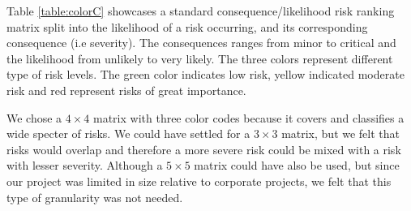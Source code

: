 \begin{table}[h]
\caption{Consequence and likelihood color coding risk matrix}
\label{table:colorC}
\end{table}

Table \ref{table:colorC} showcases a standard consequence/likelihood risk ranking matrix split into the likelihood of a risk occurring, and its corresponding consequence (i.e severity). The consequences ranges from minor to critical and the likelihood from unlikely to very likely. The three colors represent different type of risk levels. The green color indicates low risk, yellow indicated moderate risk and red represent risks of great importance. 

We chose a $4\times4$ matrix with three color codes because it covers and classifies a wide specter of risks. We could have settled for a $3\times3$ matrix, but we felt that risks would overlap and therefore a more severe risk could be mixed with a risk with lesser severity. Although a $5\times5$ matrix could have also be used, but since our project was limited in size relative to corporate projects, we felt that this type of granularity was not needed. 


